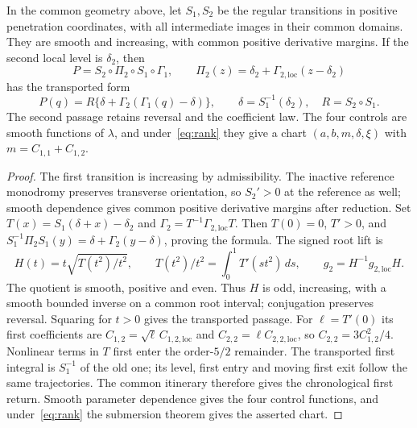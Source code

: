 \begin{proposition}
\label{prop:field-recognition}\label{prop:passage:field-recognition}
In the common geometry above, let $S_1,S_2$ be the regular transitions in
positive penetration coordinates, with all intermediate images in their
common domains. They are smooth and increasing, with common positive
derivative margins. If the second local level is $\delta_2$, then
\begin{equation}\label{eq:passage:unreduced-return}
 P=S_2\circ\Pi_2\circ S_1\circ\Gamma_1,
 \qquad\Pi_2(z)=\delta_2+\Gamma_{2,\mathrm{loc}}(z-\delta_2)
\end{equation}
has the transported form
\begin{equation}\label{eq:passage:recognized-return}
 P(q)=R\{\delta+\Gamma_2(\Gamma_1(q)-\delta)\},
 \qquad\delta=S_1^{-1}(\delta_2),\quad R=S_2\circ S_1.
\end{equation}
The second passage retains reversal and the coefficient law. The four
controls are smooth functions of $\lambda$, and under~\eqref{eq:rank} they
give a chart $(a,b,m,\delta,\xi)$ with $m=C_{1,1}+C_{1,2}$.
\end{proposition}

\begin{proof}
The first transition is increasing by admissibility. The inactive reference
monodromy preserves transverse orientation, so $S_2'>0$ at the reference as
well; smooth dependence gives common positive derivative margins after
reduction.
Set $T(x)=S_1(\delta+x)-\delta_2$ and
$\Gamma_2=T^{-1}\Gamma_{2,\mathrm{loc}}T$.
Then $T(0)=0$, $T'>0$, and
$S_1^{-1}\Pi_2S_1(y)=\delta+\Gamma_2(y-\delta)$, proving the formula.
The signed root lift is
\[
 H(t)=t\sqrt{T(t^2)/t^2},\qquad
 T(t^2)/t^2=\int_0^1T'(st^2)\,ds,\qquad
 g_2=H^{-1}g_{2,\mathrm{loc}}H.
\]
The quotient is smooth, positive and even. Thus $H$ is odd, increasing,
with a smooth bounded inverse on a common root interval; conjugation
preserves reversal. Squaring for $t>0$ gives the transported passage.
For $\ell=T'(0)$ its first coefficients are
$C_{1,2}=\sqrt\ell\,C_{1,2,\mathrm{loc}}$ and
$C_{2,2}=\ell C_{2,2,\mathrm{loc}}$, so $C_{2,2}=3C_{1,2}^2/4$.
Nonlinear terms in $T$ first enter the order-$5/2$ remainder.
The transported first integral is $S_1^{-1}$ of the old one; its level,
first entry and moving first exit follow the same trajectories.
The common itinerary therefore gives the chronological first return.
Smooth parameter dependence gives the four control functions, and
under~\eqref{eq:rank} the submersion theorem gives the asserted chart.
\end{proof}

